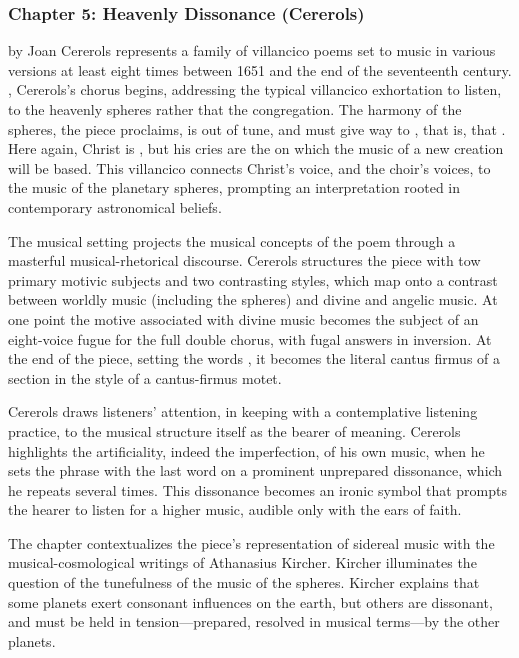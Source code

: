 \documentclass{vcbook-proposal}
\begin{document}
\subsubsection{Chapter 5: Heavenly Dissonance (Cererols)}

 by Joan Cererols represents a family of villancico poems set to music in various versions at least eight times between 1651 and the end of the seventeenth century.
, Cererols's chorus begins, addressing the typical villancico exhortation to listen, to the heavenly spheres rather that the congregation. 
The harmony of the spheres, the piece proclaims, is out of tune, and must give way to , that is,  that .
Here again, Christ is , but his cries are the  on which the music of a new creation will be based.
This villancico connects Christ's voice, and the choir's voices, to the music of the planetary spheres, prompting an interpretation rooted in contemporary astronomical beliefs.

The musical setting projects the musical concepts of the poem through a masterful musical-rhetorical discourse.
Cererols structures the piece with tow primary motivic subjects and two contrasting styles, which map onto a contrast between worldly music (including the spheres) and divine and angelic music. 
At one point the motive associated with divine music becomes the subject of an eight-voice fugue for the full double chorus, with fugal answers in inversion.
At the end of the piece, setting the words , it becomes the literal cantus firmus of a section in the style of a cantus-firmus motet.

Cererols draws listeners' attention, in keeping with a contemplative listening practice, to the musical structure itself as the bearer of meaning.
Cererols highlights the artificiality, indeed the imperfection, of his own music, when he sets the phrase  with the last word on a prominent unprepared dissonance, which he repeats several times.
This dissonance becomes an ironic symbol that prompts the hearer to listen for a higher music, audible only with the ears of faith.

The chapter contextualizes the piece's representation of sidereal music with the musical-cosmological writings of Athanasius Kircher.
Kircher illuminates the question of the tunefulness of the music of the spheres.
Kircher explains that some planets exert consonant influences on the earth, but others are dissonant, and must be held in tension---prepared, resolved in musical terms---by the other planets. 
\end{document}
